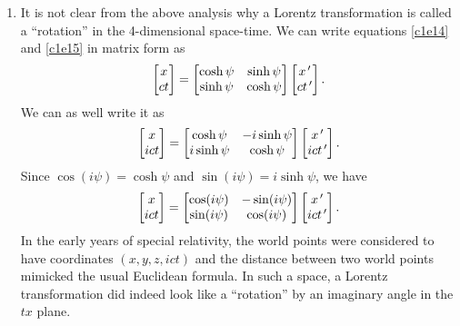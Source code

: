 \begin{enumerate}
\item It is not clear from the above analysis why a Lorentz transformation is
called a ``rotation'' in the 4-dimensional space-time. We can write equations 
\eqref{c1e14} and \eqref{c1e15} in matrix form as
\begin{equation}\label{c1e23}
\begin{bmatrix}x \\ ct \end{bmatrix} = 
\begin{bmatrix} \cosh\psi & \sinh\psi \\
\sinh\psi & \cosh\psi \end{bmatrix}\begin{bmatrix}x^{\,\prime} \\ ct^{\,\prime} 
\end{bmatrix}.
\end{equation}
We can as well write it as
\begin{equation}\label{c1e24}
\begin{bmatrix}x \\ ict \end{bmatrix} = 
\begin{bmatrix} \cosh\psi & -i\sinh\psi \\
i\sinh\psi & \cosh\psi \end{bmatrix}\begin{bmatrix}x^{\,\prime} \\ ict^{\,\prime} 
\end{bmatrix}.
\end{equation}
Since $\cos(i\psi) = \cosh\psi$ and $\sin(i\psi) = i\sinh\psi$, we have
\begin{equation}\label{c1e25}
\begin{bmatrix}x \\ ict \end{bmatrix} = 
\begin{bmatrix} \cos(i\psi) & -\sin(i\psi) \\
\sin(i\psi) & \cos(i\psi) \end{bmatrix}\begin{bmatrix}x^{\,\prime} \\ ict^{\,\prime} 
\end{bmatrix}.
\end{equation}
In the early years of special relativity, the world points were considered to 
have coordinates $(x, y, z, ict)$ and the distance between two world points 
mimicked the usual Euclidean formula. In such a space, a Lorentz transformation 
did indeed look like a ``rotation'' by an imaginary angle in the $tx$ plane.


\end{enumerate}
